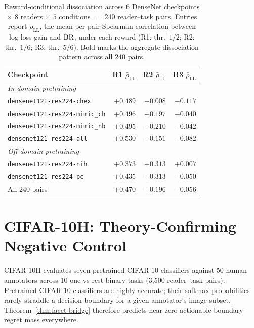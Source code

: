 \begin{table}[htbp]
\centering
\caption{Reward-conditional dissociation across $6$ DenseNet checkpoints $\times$ $8$ readers $\times$ $5$ conditions $=$ $240$ reader--task pairs.
  Entries report $\bar\rho_{\mathrm{LL}}$, the mean per-pair Spearman correlation between log-loss gain and $\operatorname{BR}$, under each reward (R1: thr.\ $1/2$; R2: thr.\ $1/6$; R3: thr.\ $5/6$).
  Bold marks the aggregate dissociation pattern across all $240$ pairs.
}
\label{tab:robustness}
\small
\begin{tabular}{@{}lrrr@{}}
\toprule
Checkpoint & R1 $\bar\rho_{\mathrm{LL}}$ & R2 $\bar\rho_{\mathrm{LL}}$ & R3 $\bar\rho_{\mathrm{LL}}$ \\
\midrule
\multicolumn{4}{l}{\textit{In-domain pretraining}} \\
\texttt{densenet121-res224-chex}      & $+0.489$ & $-0.008$ & $-0.117$ \\
\texttt{densenet121-res224-mimic\_ch} & $+0.496$ & $+0.197$ & $-0.040$ \\
\texttt{densenet121-res224-mimic\_nb} & $+0.495$ & $+0.210$ & $-0.042$ \\
\texttt{densenet121-res224-all}       & $+0.530$ & $+0.151$ & $-0.082$ \\
\midrule
\multicolumn{4}{l}{\textit{Off-domain pretraining}} \\
\texttt{densenet121-res224-nih}       & $+0.373$ & $+0.313$ & $+0.007$ \\
\texttt{densenet121-res224-pc}        & $+0.435$ & $+0.313$ & $-0.050$ \\
\midrule
All 240 pairs                         & $\mathbf{+0.470}$ & $+0.196$ & $\mathbf{-0.056}$ \\
\bottomrule
\end{tabular}
\end{table}

\section{CIFAR-10H: Theory-Confirming Negative Control}
\label{app:exp2-cifar10h}

CIFAR-10H \citep{PetersonEtAl2019} evaluates seven pretrained CIFAR-10 \citep{Krizhevsky2009} classifiers \citep{ChenCIFARModels} against 50 human annotators across 10 one-vs-rest binary tasks (3{,}500 reader--task pairs).
Pretrained CIFAR-10 classifiers are highly accurate; their softmax probabilities rarely straddle a decision boundary for a given annotator's image subset.
Theorem~\ref{thm:facet-bridge} therefore predicts near-zero actionable boundary-regret mass everywhere.

